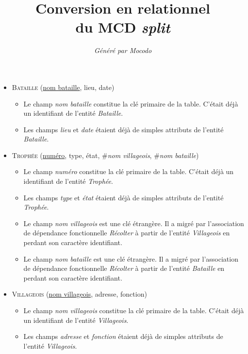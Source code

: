 \documentclass[a4paper]{article}
\title{Conversion en relationnel\\du MCD \emph{split}}
\author{\emph{Généré par Mocodo}}
\newcommand{\relat}[1]{\textsc{#1}}
\newcommand{\attr}[1]{#1}
\newcommand{\prim}[1]{\uline{#1}}
\newcommand{\foreign}[1]{\#\textsl{#1}}
\begin{document}
\maketitle

\begin{itemize}
  \item \relat{Bataille} (\prim{nom bataille}, \attr{lieu}, \attr{date})
  \begin{itemize}
    \item Le champ \emph{nom bataille} constitue la clé primaire de la table. C'était déjà un identifiant de l'entité \emph{Bataille}.
    \item Les champs \emph{lieu} et \emph{date} étaient déjà de simples attributs de l'entité \emph{Bataille}.
  \end{itemize}

  \item \relat{Trophée} (\prim{numéro}, \attr{type}, \attr{état}, \foreign{nom villageois}, \foreign{nom bataille})
  \begin{itemize}
    \item Le champ \emph{numéro} constitue la clé primaire de la table. C'était déjà un identifiant de l'entité \emph{Trophée}.
    \item Les champs \emph{type} et \emph{état} étaient déjà de simples attributs de l'entité \emph{Trophée}.
    \item Le champ \emph{nom villageois} est une clé étrangère. Il a migré par l'association de dépendance fonctionnelle \emph{Récolter} à partir de l'entité \emph{Villageois} en perdant son caractère identifiant.
    \item Le champ \emph{nom bataille} est une clé étrangère. Il a migré par l'association de dépendance fonctionnelle \emph{Récolter} à partir de l'entité \emph{Bataille} en perdant son caractère identifiant.
  \end{itemize}

  \item \relat{Villageois} (\prim{nom villageois}, \attr{adresse}, \attr{fonction})
  \begin{itemize}
    \item Le champ \emph{nom villageois} constitue la clé primaire de la table. C'était déjà un identifiant de l'entité \emph{Villageois}.
    \item Les champs \emph{adresse} et \emph{fonction} étaient déjà de simples attributs de l'entité \emph{Villageois}.
  \end{itemize}

\end{itemize}
\end{document}
